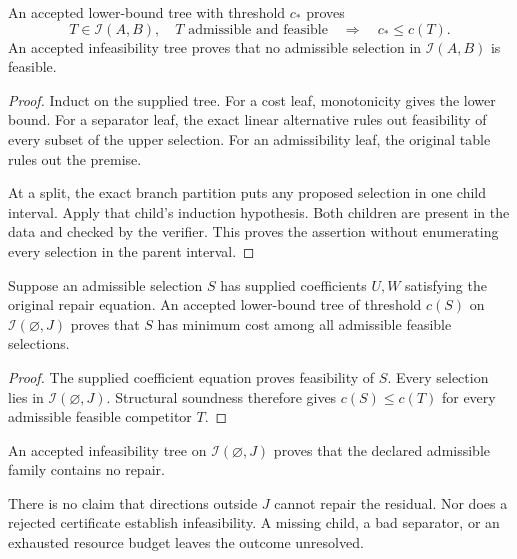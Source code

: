 \begin{CRtheorem}
An accepted lower-bound tree with threshold $c_\ast$ proves
\[
 T\in\mathcal I(A,B),\quad T\text{ admissible and feasible}
 \quad\Longrightarrow\quad c_\ast\leq c(T).
\]
An accepted infeasibility tree proves that no admissible selection in $\mathcal I(A,B)$ is feasible.
\end{CRtheorem}

\begin{proof}
Induct on the supplied tree. For a cost leaf, monotonicity gives the lower bound. For a separator leaf, the exact linear alternative rules out feasibility of every subset of the upper selection. For an admissibility leaf, the original table rules out the premise.

At a split, the exact branch partition puts any proposed selection in one child interval. Apply that child's induction hypothesis. Both children are present in the data and checked by the verifier. This proves the assertion without enumerating every selection in the parent interval.
\end{proof}

\begin{CRcorollary}
Suppose an admissible selection $S$ has supplied coefficients $U,W$ satisfying the original repair equation. An accepted lower-bound tree of threshold $c(S)$ on $\mathcal I(\varnothing,J)$ proves that $S$ has minimum cost among all admissible feasible selections.
\end{CRcorollary}
\begin{proof}
The supplied coefficient equation proves feasibility of $S$. Every selection lies in $\mathcal I(\varnothing,J)$. Structural soundness therefore gives $c(S)\leq c(T)$ for every admissible feasible competitor $T$.
\end{proof}

\begin{CRcorollary}
An accepted infeasibility tree on $\mathcal I(\varnothing,J)$ proves that the declared admissible family contains no repair.
\end{CRcorollary}

There is no claim that directions outside $J$ cannot repair the residual. Nor does a rejected certificate establish infeasibility. A missing child, a bad separator, or an exhausted resource budget leaves the outcome unresolved.

